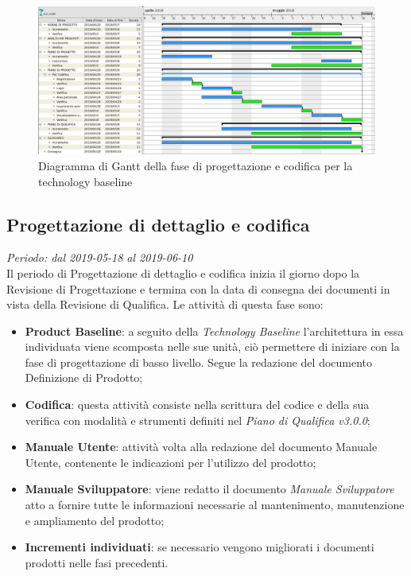 \begin{figure}[H]
	\includegraphics[width=0.99\linewidth]{res/images/gantt_pa.png}
	\caption{Diagramma di Gantt della fase di progettazione e codifica per la technology baseline}
\end{figure}


\subsection{Progettazione di dettaglio e codifica}
\textit{Periodo: dal 2019-05-18 al 2019-06-10} \\
Il periodo di Progettazione di dettaglio e codifica inizia il giorno dopo la Revisione di Progettazione e termina con la data di consegna dei documenti 
in vista della Revisione di Qualifica. Le attività di questa fase sono:
\begin{itemize}
	\item \textbf{Product Baseline\glo}: a seguito della \textit{Technology 
	Baseline\glosp} l'architettura in essa individuata viene scomposta nelle sue unità, ciò permettere di iniziare con la fase di progettazione di basso livello. Segue la redazione del documento Definizione di Prodotto;
	\item \textbf{Codifica}: questa attività consiste nella scrittura del 
	codice e della sua verifica con modalità e strumenti definiti nel 
	\textit{Piano di Qualifica v3.0.0};
	\item \textbf{Manuale Utente}: attività volta alla redazione del documento Manuale Utente, contenente le indicazioni per l'utilizzo del prodotto;
	\item \textbf{Manuale Sviluppatore}: viene redatto il documento \textit{Manuale Sviluppatore} atto a fornire tutte le informazioni necessarie al mantenimento, manutenzione e ampliamento del prodotto;
	\item \textbf{Incrementi individuati}: se necessario vengono migliorati i 
	documenti prodotti nelle fasi precedenti.
\end{itemize}


